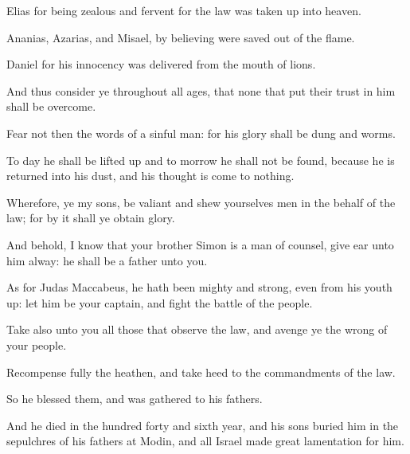 {\par }{\PP {}Elias for being zealous and fervent for the law was taken up into heaven.
\par }{\PP {}Ananias, Azarias, and Misael, by believing were saved out of the flame.
\par }{\PP {}Daniel for his innocency was delivered from the mouth of lions.
\par }{\PP {}And thus consider ye throughout all ages, that none that put their trust in him shall be overcome.
\par }{\PP {}Fear not then the words of a sinful man: for his glory shall be dung and worms.
\par }{\PP {}To day he shall be lifted up and to morrow he shall not be found, because he is returned into his dust, and his thought is come to nothing.
\par }{\PP {}Wherefore, ye my sons, be valiant and shew yourselves men in the behalf of the law; for by it shall ye obtain glory.
\par }{\PP {}And behold, I know that your brother Simon is a man of counsel, give ear unto him alway: he shall be a father unto you.
\par }{\PP {}As for Judas Maccabeus, he hath been mighty and strong, even from his youth up: let him be your captain, and fight the battle of the people.
\par }{\PP {}Take also unto you all those that observe the law, and avenge ye the wrong of your people.
\par }{\PP {}Recompense fully the heathen, and take heed to the commandments of the law.
\par }{\PP {}So he blessed them, and was gathered to his fathers.
\par }{\PP {}And he died in the hundred forty and sixth year, and his sons buried him in the sepulchres of his fathers at Modin, and all Israel made great lamentation for him.

}
